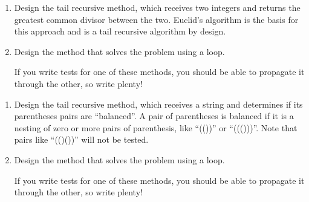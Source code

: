 \begin{enumerate}[label=(\alph*)]
    \item Design the  tail recursive method, which receives two integers and returns the greatest common divisor between the two. Euclid's algorithm is the basis for this approach and is a tail recursive algorithm by design.
    \item Design the  method that solves the problem using a loop.

    If you write tests for one of these methods, you should be able to propagate it through the other, so write plenty!
\end{enumerate}

\begin{enumerate}[label=(\alph*)]
    \item Design the  tail recursive method, which receives a string and determines if its parentheses pairs are ``balanced''. A pair of parentheses is balanced if it is a nesting of zero or more pairs of parenthesis, like ``(())'' or ``((()))''. Note that pairs like ``(()())'' will not be tested.

    \item Design the  method that solves the problem using a loop.

    If you write tests for one of these methods, you should be able to propagate it through the other, so write plenty!
\end{enumerate}

